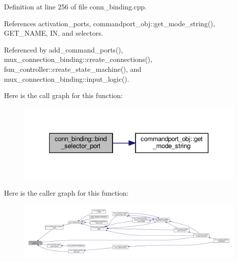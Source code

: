 Definition at line 256 of file conn\+\_\+binding.\+cpp.



References activation\+\_\+ports, commandport\+\_\+obj\+::get\+\_\+mode\+\_\+string(), G\+E\+T\+\_\+\+N\+A\+ME, IN, and selectors.



Referenced by add\+\_\+command\+\_\+ports(), mux\+\_\+connection\+\_\+binding\+::create\+\_\+connections(), fsm\+\_\+controller\+::create\+\_\+state\+\_\+machine(), and mux\+\_\+connection\+\_\+binding\+::input\+\_\+logic().

Here is the call graph for this function\+:
\nopagebreak
\begin{figure}[H]
\begin{center}
\leavevmode
\includegraphics[width=327pt]{d2/db1/classconn__binding_ad6d2c05551ea948d7ce6b4e015292e5e_cgraph}
\end{center}
\end{figure}
Here is the caller graph for this function\+:
\nopagebreak
\begin{figure}[H]
\begin{center}
\leavevmode
\includegraphics[width=350pt]{d2/db1/classconn__binding_ad6d2c05551ea948d7ce6b4e015292e5e_icgraph}
\end{center}
\end{figure}
\mbox{\label{classconn__binding_a723f7511cfb4dd34de9be43801fea518}} 
